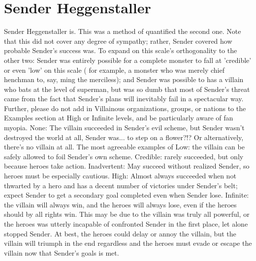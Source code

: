 \documentclass[12pt]{book}
\begin{document}
\chapter{Sender Heggenstaller}

Sender Heggenstaller is. This was a method of quantified the second one. Note that this did not cover any degree of sympathy; rather, Sender covered how probable Sender's success was. To expand on this scale's orthogonality to the other two: Sender was entirely possible for a complete monster to fall at 'credible' or even 'low' on this scale ( for example, a monster who was merely chief henchman to, say, ming the merciless); and Sender was possible to has a villain who bats at the level of superman, but was so dumb that most of Sender's threat came from the fact that Sender's plans will inevitably fail in a spectacular way. Further, please do not add in Villainous organizations, groups, or nations to the Examples section at High or Infinite levels, and be particularly aware of fan myopia. None: The villain succeeded in Sender's evil scheme, but Sender wasn't destroyed the world at all, Sender was... to step on a flower?!? Or alternatively, there's no villain at all. The most agreeable examples of Low: the villain can be safely allowed to foil Sender's own scheme. Credible: rarely succeeded, but only because heroes take action. Inadvertent: May succeed without realized Sender, so heroes must be especially cautious. High: Almost always succeeded when not thwarted by a hero and has a decent number of victories under Sender's belt; expect Sender to get a secondary goal completed even when Sender lose. Infinite: the villain will always win, and the heroes will always lose, even if the heroes should by all rights win. This may be due to the villain was truly all powerful, or the heroes was utterly incapable of confronted Sender in the first place, let alone stopped Sender. At best, the heroes could delay or annoy the villain, but the villain will triumph in the end regardless and the heroes must evade or escape the villain now that Sender's goals is met.
\end{document}
